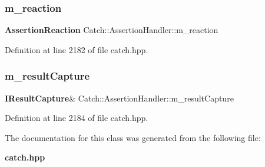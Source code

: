\subsubsection{m\_reaction}
{\footnotesize\ttfamily \textbf{ Assertion\+Reaction} Catch\+::\+Assertion\+Handler\+::m\+\_\+reaction\hspace{0.3cm}{\ttfamily [private]}}



Definition at line 2182 of file catch.\+hpp.

\mbox{\label{class_catch_1_1_assertion_handler_aea5283ee36124ce5c51dc2a697b22a39}} 
\subsubsection{m\_resultCapture}
{\footnotesize\ttfamily \textbf{ I\+Result\+Capture}\& Catch\+::\+Assertion\+Handler\+::m\+\_\+result\+Capture\hspace{0.3cm}{\ttfamily [private]}}



Definition at line 2184 of file catch.\+hpp.



The documentation for this class was generated from the following file\+:\begin{DoxyCompactItemize}
\item 
\textbf{ catch.\+hpp}\end{DoxyCompactItemize}
